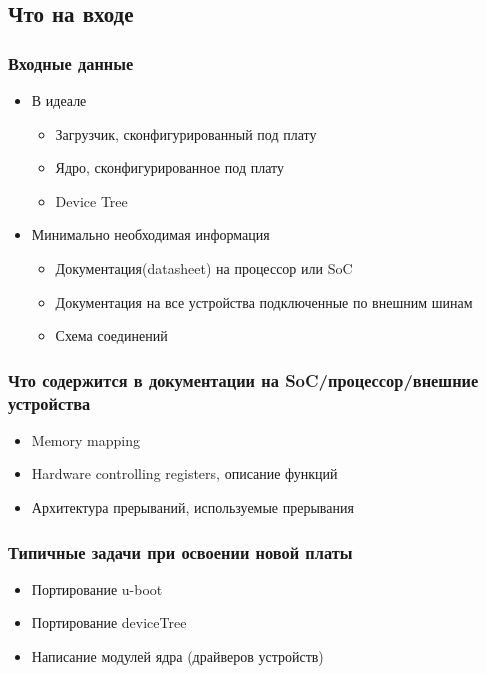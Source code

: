 \subsection{Что на входе}
\begin{frame}
  \frametitle{Входные данные}
  \begin{itemize}
      \item В идеале
        \begin{itemize}
            \item Загрузчик, сконфигурированный под плату
            \item Ядро, сконфигурированное под  плату
            \item Device Tree 
        \end{itemize}
      \item Минимально необходимая информация
        \begin{itemize}
          \item Документация(datasheet) на процессор или SoC
          \item Документация на все устройства подключенные по внешним шинам
          \item Схема соединений
        \end{itemize}
  \end{itemize}
\end{frame}
\begin{frame}
  \frametitle{Что содержится в документации на SoC/процессор/внешние устройства}
  \begin{itemize}
      \item Memory mapping
      \item Hardware controlling registers, описание функций
      \item Архитектура прерываний, используемые прерывания
  \end{itemize}
\end{frame}
\begin{frame}
  \frametitle{Типичные задачи при освоении новой платы}
  \begin{itemize}
      \item Портирование u-boot
      \item Портирование deviceTree
      \item Написание модулей ядра (драйверов устройств)
  \end{itemize}
\end{frame}
